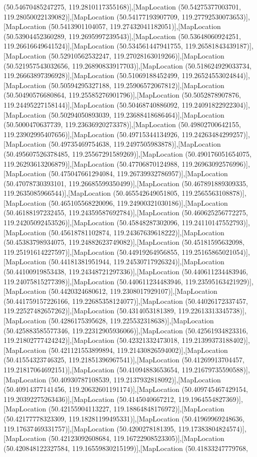 (50.54670485247275, 119.2810117355168)],[MapLocation (50.54275377003701, 119.28050022139082)],[MapLocation (50.54177193907709, 119.27792530073653)],[MapLocation (50.5413901104057, 119.27432041182051)],[MapLocation (50.53904452360289, 119.2695997239543)],[MapLocation (50.53648060924251, 119.26616649641524)],[MapLocation (50.534561447941755, 119.26581843439187)],[MapLocation (50.52910562532247, 119.27028163019266)],[MapLocation (50.521957543032656, 119.26890833917703)],[MapLocation (50.518624929033734, 119.26663897396928)],[MapLocation (50.51069188452499, 119.26524553024844)],[MapLocation (50.50594295327188, 119.25906572067812)],[MapLocation (50.50490576680864, 119.25585276901796)],[MapLocation (50.5052878907876, 119.24495227158144)],[MapLocation (50.50468740886092, 119.24091822922304)],[MapLocation (50.50294050893039, 119.23688418686464)],[MapLocation (50.5000470637739, 119.23636920273378)],[MapLocation (50.49802700642155, 119.23902995407656)],[MapLocation (50.49715344134926, 119.24263484299257)],[MapLocation (50.49735469754638, 119.2497505983878)],[MapLocation (50.495607526378485, 119.25567291589269)],[MapLocation (50.490176051654075, 119.26293613206879)],[MapLocation (50.47706870124988, 119.26963092576996)],[MapLocation (50.475047661294084, 119.26739932786957)],[MapLocation (50.47078730393101, 119.26685599350499)],[MapLocation (50.467891889309335, 119.2635085966544)],[MapLocation (50.465542649051805, 119.2565563108878)],[MapLocation (50.465105568220096, 119.24900321030186)],[MapLocation (50.46188197232455, 119.24359587692784)],[MapLocation (50.460625256772275, 119.24205092453526)],[MapLocation (50.45848287302096, 119.24110147552793)],[MapLocation (50.45618781102874, 119.24367639618222)],[MapLocation (50.45383798934075, 119.24882623749082)],[MapLocation (50.45181595632098, 119.25191614227597)],[MapLocation (50.44919264956855, 119.25165865021054)],[MapLocation (50.44181381951944, 119.24530717926324)],[MapLocation (50.44100919853438, 119.24348721297336)],[MapLocation (50.440611234483946, 119.24075815277398)],[MapLocation (50.440611234483946, 119.23595163421929)],[MapLocation (50.4420324680612, 119.2308017929107)],[MapLocation (50.441759157226166, 119.22685358124077)],[MapLocation (50.44026172337457, 119.22527482657262)],[MapLocation (50.4314053181389, 119.22613313345738)],[MapLocation (50.4286175395628, 119.225532318638)],[MapLocation (50.425883585577346, 119.22312905936066)],[MapLocation (50.42561934823316, 119.21802777424242)],[MapLocation (50.42321332473018, 119.21399373188402)],[MapLocation (50.421121553899894, 119.21430826594002)],[MapLocation (50.41554323746325, 119.21851396967541)],[MapLocation (50.41269913704457, 119.21817064692151)],[MapLocation (50.41094883653654, 119.21679735590588)],[MapLocation (50.40930787108539, 119.2137932818092)],[MapLocation (50.40914377141456, 119.20632601191174)],[MapLocation (50.409745467429154, 119.20392275263436)],[MapLocation (50.4145040667212, 119.1964554827369)],[MapLocation (50.42155904113227, 119.18864848176972)],[MapLocation (50.42177778323309, 119.18281199495331)],[MapLocation (50.41969969248636, 119.17637469331757)],[MapLocation (50.4200278181395, 119.17383804824574)],[MapLocation (50.42123092608684, 119.16722908523305)],[MapLocation (50.420848122327584, 119.16559830215199)],[MapLocation (50.41833247779768, 